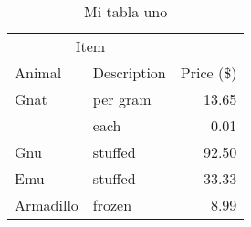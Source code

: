 \lipsum[1-1] \cite{latex:companion}

\begin{table}[H]
    \centering
    \begin{tabular}{@{}llr@{}}
        \toprule
        \multicolumn{2}{c}{Item} &                          \\ \cmidrule(r){1-2}
        Animal                   & Description & Price (\$) \\ \midrule
        Gnat                     & per gram    & 13.65      \\
                                 & each        & 0.01       \\
        Gnu                      & stuffed     & 92.50      \\
        Emu                      & stuffed     & 33.33      \\
        Armadillo                & frozen      & 8.99       \\ \bottomrule
    \end{tabular}
    \caption{Mi tabla uno}
    \label{tab:tabla1}
\end{table}